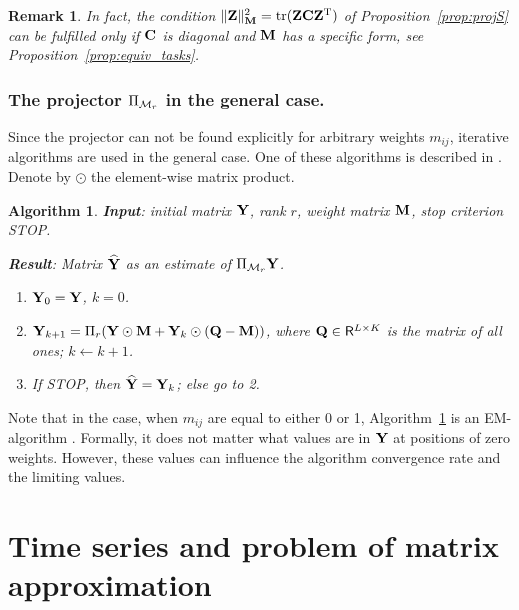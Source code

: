 \documentclass[sii]{ipart}
\DeclareMathOperator{\tr}{tr}
\newtheorem{algorithm}{Algorithm}
\newtheorem{remark}{Remark}
\begin{document}
\begin{remark}
\label{rem:diagC}
	In fact, the condition $\|\bfZ\|_\bfM^2 = \tr(\bfZ \bfC \bfZ^\rmT)$ of Proposition~\ref{prop:projS} can be fulfilled only if $\mathbf{C}$ is diagonal and $\mathbf{M}$ has a specific form, see Proposition~\ref{prop:equiv_tasks}.
\end{remark}

\subsubsection{The projector $\Pi_{\mathcal{M}_r}$ in the general case.}
Since the projector can not be found explicitly for arbitrary weights $m_{ij}$, iterative algorithms are used in the general case.
One of these algorithms is described in \cite{Srebro2003}. Denote by $\odot$ the element-wise matrix product.

\begin{algorithm}
	\label{alg:weightedSVD}
	\textbf{Input}: initial matrix $\mathbf{Y}$, rank $r$, weight matrix $\mathbf{M}$,
	stop criterion STOP.
	
	\textbf{Result}:
	Matrix $\widehat{\mathbf{Y}}$ as an estimate of $\Pi_{\mathcal{M}_r} \mathbf{Y}$.
	
	\begin{enumerate}
		\item
		$\mathbf{Y}_0 = \mathbf{Y}$, $k=0$.
		\item
		$\mathbf{Y}_{k+1} = \Pi_r(\mathbf{Y} \odot \mathbf{M} + \mathbf{Y}_{k} \odot (\mathbf{Q} -  \mathbf{M}))$, where
		$\mathbf{Q} \in \mathsf{R}^{L \times K}$ is the matrix of all ones;
        \quad $k\leftarrow k+1$.
		\item
		If STOP, then $\widehat{\mathbf{Y}} = \mathbf{Y}_k$; else go to 2.
	\end{enumerate}
\end{algorithm}

Note that in the case, when $m_{ij}$ are equal to either 0 or 1, Algorithm~\ref{alg:weightedSVD} is an EM-algorithm \cite{Srebro2003}.
Formally, it does not matter what values are in $\mathbf{Y}$ at positions of zero weights. However, these values can influence the algorithm convergence rate and the limiting values.

\section{Time series and problem of matrix approximation}
\label{sec:ts_matrices}
\end{document}
